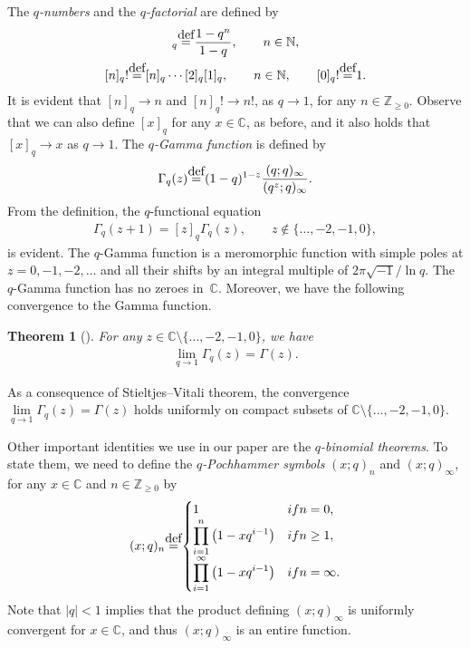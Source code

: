 \documentclass[11pt]{article}
\numberwithin{equation}{section}
\newcommand\myeq{\mathrel{\stackrel{\makebox[0pt]{\mbox{\normalfont\tiny def}}}{=}}}
\newtheorem{thm}{Theorem}[section]
\newcommand{\C}{\mathbb{C}}
\newcommand{\Z}{\mathbb{Z}}
\newcommand{\N}{\mathbb{N}}
\begin{document}
The \textit{$q$-numbers} and the \textit{$q$-factorial} are def\/ined by
\begin{gather*}
[n]_q \myeq \frac{1 - q^n}{1 - q}, \qquad n\in\N,\\
[n]_q! \myeq [n]_q\cdots[2]_q[1]_q, \qquad n\in\N, \qquad [0]_q! \myeq 1.
\end{gather*}
It is evident that $[n]_q \rightarrow n$ and $[n]_q!\rightarrow n!$, as $q\rightarrow 1$, for any $n\in\Z_{\geq 0}$. Observe that we can also def\/ine $[x]_q$ for any $x\in\C$, as before, and it also holds that $[x]_q \rightarrow x$ as $q\rightarrow 1$. The \textit{$q$-Gamma function} is def\/ined by
\begin{gather*}
\Gamma_q(z) \myeq (1 - q)^{1-z}\frac{(q; q)_{\infty}}{(q^z; q)_{\infty}}.
\end{gather*}
From the def\/inition, the $q$-functional equation
\begin{gather*}
\Gamma_q(z + 1) = [z]_q\Gamma_q(z), \qquad z\notin\{\dots, -2, -1, 0\},
\end{gather*}
is evident. The $q$-Gamma function is a meromorphic function with simple poles at $z = 0, -1, -2, \dots$ and all their shifts by an integral multiple of $2\pi\sqrt{-1}/\ln{q}$.
The $q$-Gamma function has no zeroes in~$\C$. Moreover, we have the following convergence to the Gamma function.

\begin{thm}[{\cite[Corollary~10.3.4]{AAR}}]\label{qtheory1}
For any $z\in\C \setminus \{\dots, -2, -1, 0\}$, we have
\begin{gather*}
\lim_{q\rightarrow 1}{\Gamma_q(z)} = \Gamma(z).
\end{gather*}
\end{thm}
\begin{rem}\label{qtheory1remark}
As a consequence of Stieltjes--Vitali theorem, the convergence $\lim\limits_{q\rightarrow 1}{\Gamma_q(z)} = \Gamma(z)$ holds uniformly on compact subsets of $\C \setminus \{\dots, -2, -1, 0\}$.
\end{rem}

Other important identities we use in our paper are the \textit{$q$-binomial theorems}. To state them, we need to def\/ine the \textit{$q$-Pochhammer symbols} $(x; q)_n$ and $(x; q)_{\infty}$, for any $x\in\C$ and $n\in\Z_{\geq 0}$ by
\begin{gather*}
(x; q)_n \myeq
 \begin{cases}
 1 & \textrm{if } n = 0,\\
 \displaystyle \prod\limits_{i=1}^n{\big(1 - xq^{i-1}\big)} & \textrm{if } n\geq 1,\\
 \displaystyle \prod\limits_{i=1}^{\infty}{\big(1 - xq^{i-1}\big)} & \textrm{if } n = \infty.
 \end{cases}
\end{gather*}
Note that $|q| < 1$ implies that the product def\/ining $(x; q)_{\infty}$ is uniformly convergent for $x\in\C$, and thus $(x; q)_{\infty}$ is an entire function.
\end{document}
